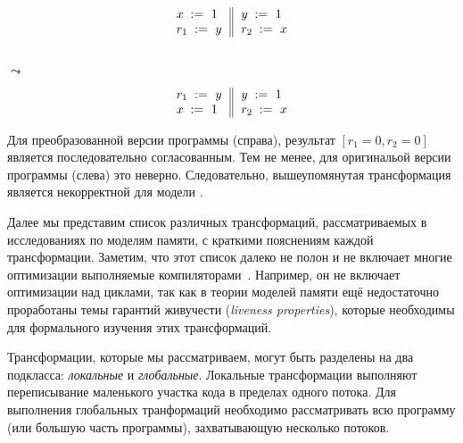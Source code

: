 \begin{minipage}{0.45\linewidth}
\begin{equation*}
\inarrII{
   \writeInst{}{x}{1}   \\
   \readInst{}{r_1}{y}  \\
}{
  \writeInst{}{y}{1}   \\
  \readInst{}{r_2}{x}  \\
}
\end{equation*}
\end{minipage}\hfill%
\begin{minipage}{0.05\linewidth}
\Large~\\ $\leadsto$
\end{minipage}\hfill%
\begin{minipage}{0.45\linewidth}
\begin{equation*}
\inarrII{
   \readInst{}{r_1}{y}  \\
   \writeInst{}{x}{1}   \\
}{
  \writeInst{}{y}{1}   \\
  \readInst{}{r_2}{x}  \\
}
\end{equation*}
\end{minipage}

Для преобразованной версии программы (справа),
результат $[r_1=0, r_2=0]$ является последовательно согласованным. 
Тем не менее, для оригинальой версии программы (слева) это неверно. 
Следовательно, вышеупомянутая трансформация 
является некорректной для модели \SC. 

Далее мы представим список различных трансформаций,
рассматриваемых в исследованиях по моделям памяти, 
с краткими пояснениям каждой трансформации. 
Заметим, что этот список далеко не полон 
и не включает многие оптимизации 
выполняемые компиляторами~\cite{Muchnick:ACDI97}.
Например, он не включает оптимизации над циклами,
так как в теории моделей памяти ещё недостаточно 
проработаны темы гарантий живучести 
(\emph{liveness properties}), 
которые необходимы для формального 
изучения этих трансформаций. 

Трансформации, которые мы рассматриваем, могут быть 
разделены на два подкласса: \emph{локальные} и \emph{глобальные}.
Локальные трансформации выполняют переписывание 
маленького участка кода в пределах одного потока. 
Для выполнения глобальных транформаций 
необходимо рассматривать всю программу 
(или большую часть программы), 
захватывающую несколько потоков.      
 
